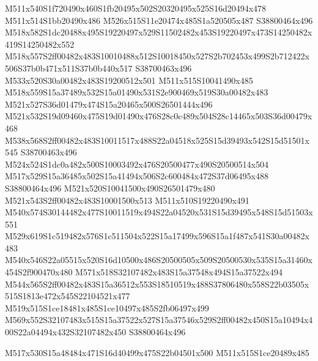\documentclass{article}
\begin{document}
\begin{multicols}{2}
M511x540S1f720490x460S1fb20495x502S20320495x525S16d20494x478 M511x514S1bb20490x486 M526x515S11e20474x485S1a520505x487 S38800464x496 M518x582S1dc20488x495S19220497x529S11502482x453S19220497x473S14250482x419S14250482x552 M518x557S2ff00482x483S10010488x512S10018450x527S2b702453x499S2b712422x506S37b0b471x511S37b0b440x517 S38700463x496 M533x520S30a00482x483S19200512x501 M511x515S10041490x485 M518x559S15a37489x532S15a01490x531S2e900469x519S30a00482x483 M521x527S36d01479x474S15a20465x500S26501444x496 M521x532S19d09460x475S19d01490x476S28c0c489x504S28c14465x503S36d00479x468 M538x568S2ff00482x483S10011517x488S22a04518x525S15d39493x542S15d51501x545 S38700463x496 M524x524S1dc0a482x500S10003492x476S20500477x490S20500514x504 M517x529S15a36485x502S15a41494x506S2c600484x472S37d06495x488 S38800464x496 M521x520S10041500x490S26501479x480 M521x543S2ff00482x483S10001500x513 M511x510S19220490x491 M540x574S30144482x477S10011519x494S22a04520x531S15d39495x548S15d51503x551 M529x619S1c519482x576S1c511504x522S15a17499x596S15a1f487x541S30a00482x483 M540x546S22a05515x520S16d10500x486S20500505x509S20500530x535S15a31460x454S2f900470x480 M571x518S32107482x483S15a37548x494S15a37522x494 M544x565S2ff00482x483S15a36512x553S18510519x488S37806480x558S22b03505x515S1813e472x545S22104521x477 M519x515S1ce18481x485S1ce10497x485S2fb06497x499 M569x552S32107483x515S15a37522x527S15a37546x529S2ff00482x450S15a10494x400S22a04494x432S32107482x450 S38800464x496




\begin{center}
M517x530S15a48484x471S16d40499x475S22b04501x500 M511x515S1ce20489x485 
\end{center}




\end{multicols}
\end{document}

